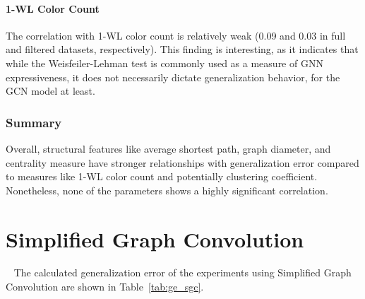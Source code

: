 \paragraph{1-WL Color Count}
The correlation with 1-WL color count is relatively weak (0.09 and 0.03 in full and filtered datasets, respectively). This finding is interesting, as it indicates that while the Weisfeiler-Lehman test is commonly used as a measure of GNN expressiveness, it does not necessarily dictate generalization behavior, for the GCN model at least.

\subsubsection{Summary}
Overall, structural features like average shortest path, graph diameter, and  centrality measure have stronger relationships with generalization error compared to measures like 1-WL color count and potentially clustering coefficient. Nonetheless, none of the parameters shows a highly significant correlation.

\section{Simplified Graph Convolution}~\label{sec:result_sgc}
The calculated generalization error of the experiments using Simplified Graph Convolution are shown in Table~\ref{tab:ge_sgc}.


